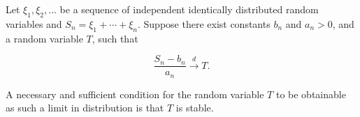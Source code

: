 Let $\xi_1, \xi_2, \ldots$ be a sequence of independent identically distributed random variables and $S_n = \xi_1 + \cdots + \xi_n$. Suppose there exist constants $b_n$ and $a_n > 0$, and a random variable $T$, such that

$$\frac{S_n - b_n}{a_n} \xrightarrow{d} T.$$

A necessary and sufficient condition for the random variable $T$ to be obtainable as such a limit in distribution is that $T$ is stable.
